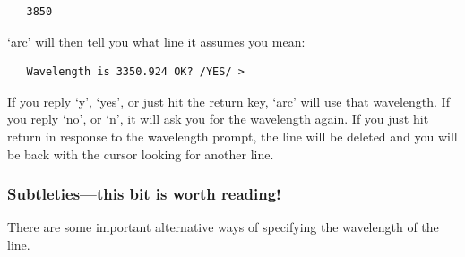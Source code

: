 \documentclass[11pt,twoside]{article}
\newcommand{\latorhtm}[2]{#1}
\newcommand{\latorhtm}[2]{#2}
\begin{document}
\begin{verbatim}
   3850
\end{verbatim}

   `arc' will then tell you what line it assumes you mean:

\begin{verbatim}
   Wavelength is 3350.924 OK? /YES/ >
\end{verbatim}

   If you reply `y', `yes', or just hit the return key, `arc' will use
   that wavelength.  If you reply `no', or `n', it will ask you for the
   wavelength again.  If you just hit return in response to the
   wavelength prompt, the line will be deleted and you will be back with
   the cursor looking for another line.


\subsubsection{\label{techno10subtle}Subtleties\latorhtm{---}{-}this bit is
   worth reading!}

   There are some important alternative ways of specifying the
   wavelength of the line.
\end{document}
